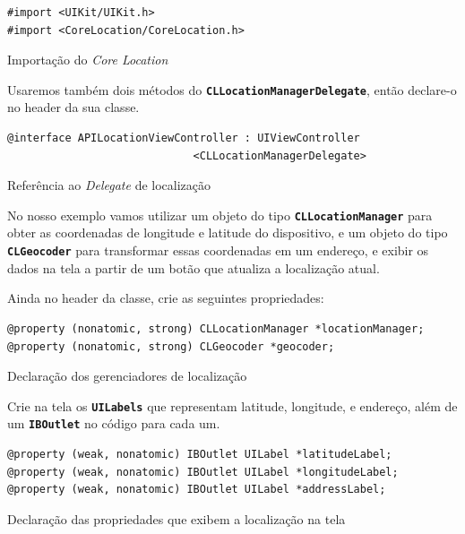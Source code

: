 \documentclass[a4paper,12pt,brazil,doubleside]{book}
\begin{document}
\begin{singlespace}
\begin{listing}[H]
\begin{verbatim}
#import <UIKit/UIKit.h>
#import <CoreLocation/CoreLocation.h>
\end{verbatim}
\caption{Importação do \emph{Core Location}}
\end{listing}


Usaremos também dois métodos do \texttt{\textbf{CLLocationManagerDelegate}}, então declare-o no header da sua classe.

\begin{listing}[H]
\begin{verbatim}
@interface APILocationViewController : UIViewController
                             <CLLocationManagerDelegate>
\end{verbatim}
\caption{Referência ao \emph{Delegate} de localização}
\end{listing}


No nosso exemplo vamos utilizar um objeto do tipo \texttt{\textbf{CLLocationManager}} para obter as coordenadas de longitude e latitude do dispositivo, e um objeto do tipo \texttt{\textbf{CLGeocoder}} para transformar essas coordenadas em um endereço, e exibir os dados na tela a partir de um botão que atualiza a localização atual.

Ainda no header da classe, crie as seguintes propriedades:

\begin{listing}[H]
\begin{verbatim}
@property (nonatomic, strong) CLLocationManager *locationManager;
@property (nonatomic, strong) CLGeocoder *geocoder;
\end{verbatim}
\caption{Declaração dos gerenciadores de localização}
\end{listing}


Crie na tela os \texttt{\textbf{UILabels}} que representam latitude, longitude, e endereço, além de um \texttt{\textbf{IBOutlet}} no código para cada um.

\begin{listing}[H]
\begin{verbatim}
@property (weak, nonatomic) IBOutlet UILabel *latitudeLabel;
@property (weak, nonatomic) IBOutlet UILabel *longitudeLabel;
@property (weak, nonatomic) IBOutlet UILabel *addressLabel;
\end{verbatim}
\caption{Declaração das propriedades que exibem a localização na tela}
\end{listing}



\end{singlespace}
\end{document}
